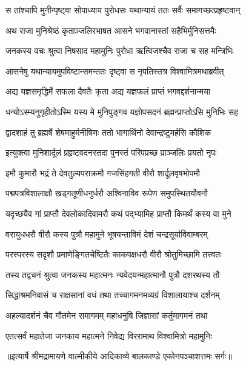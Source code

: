 \twolineshloka
{स तांश्चापि मुनीन्पृष्ट्वा सोपाध्याय पुरोधसः}
{यथान्यायं ततः सर्वैः समागच्छत्प्रहृष्टवान्} %

\twolineshloka
{अथ राजा मुनिश्रेष्ठं कृताञ्जलिरभाषत}
{आसने भगवानास्तां सहैभिर्मुनिसत्तमैः} %

\twolineshloka
{जनकस्य वचः श्रुत्वा निषसाद महामुनिः}
{पुरोधा ऋत्विजश्चैव राजा च सह मन्त्रिभिः} %

\twolineshloka
{आसनेषु यथान्यायमुपविष्टान्समन्ततः}
{दृष्ट्वा स नृपतिस्तत्र विश्वामित्रमथाब्रवीत्} %

\twolineshloka
{अद्य यज्ञसमृद्धिर्मे सफला दैवतैः कृता}
{अद्य यज्ञफलं प्राप्तं भगवद्दर्शनान्मया} %

\twolineshloka
{धन्योऽस्म्यनुगृहीतोऽस्मि यस्य मे मुनिपुङ्गव}
{यज्ञोपसदनं ब्रह्मन्प्राप्तोऽसि मुनिभिः सह} %

\twolineshloka
{द्वादशाहं तु ब्रह्मर्षे शेषमाहुर्मनीषिणः}
{ततो भागार्थिनो देवान्द्रष्टुमर्हसि कौशिक} %

\twolineshloka
{इत्युक्त्वा मुनिशार्दूलं प्रहृष्टवदनस्तदा}
{पुनस्तं परिपप्रच्छ प्राञ्जलिः प्रयतो नृपः} %

\twolineshloka
{इमौ कुमारौ भद्रं ते देवतुल्यपराक्रमौ}
{गजसिंहगती वीरौ शार्दूलवृषभोपमौ} %

\twolineshloka
{पद्मपत्रविशालाक्षौ खड्गतूणीधनुर्धरौ}
{अश्विनाविव रूपेण समुपस्थितयौवनौ} %

\twolineshloka
{यदृच्छयैव गां प्राप्तौ देवलोकादिवामरौ}
{कथं पद्भ्यामिह प्राप्तौ किमर्थं कस्य वा मुने} %

\twolineshloka
{वरायुधधरौ वीरौ कस्य पुत्रौ महामुने}
{भूषयन्ताविमं देशं चन्द्रसूर्याविवाम्बरम्} %

\twolineshloka
{परस्परस्य सदृशौ प्रमाणेङ्गितचेष्टितैः}
{काकपक्षधरौ वीरौ श्रोतुमिच्छामि तत्त्वतः} %

\twolineshloka
{तस्य तद्वचनं श्रुत्वा जनकस्य महात्मनः}
{न्यवेदयन्महात्मानौ पुत्रौ दशरथस्य तौ} %

\twolineshloka
{सिद्धाश्रमनिवासं च राक्षसानां वधं तथा}
{तच्चागमनमव्यग्रं विशालायाश्च दर्शनम्} %

\twolineshloka
{अहल्यादर्शनं चैव गौतमेन समागमम्}
{महाधनुषि जिज्ञासां कर्तुमागमनं तथा} %

\twolineshloka
{एतत्सर्वं महातेजा जनकाय महात्मने}
{निवेद्य विररामाथ विश्वामित्रो महामुनिः} %


{॥इत्यार्षे श्रीमद्रामायणे वाल्मीकीये आदिकाव्ये बालकाण्डे एकोनपञ्चाशत्तमः सर्गः॥}

